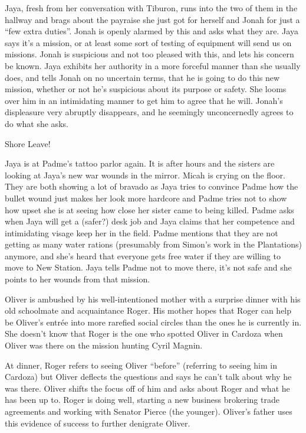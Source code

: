 Jaya, fresh from her conversation with Tiburon, runs into the two of them in the hallway and brags about the payraise she just got for herself and Jonah for just a ``few extra duties''.  Jonah is openly alarmed by this and asks what they are.  Jaya says it's a mission, or at least some sort of testing of equipment will send us on missions.  Jonah is suspicious and not too pleased with this, and lets his concern be known.  Jaya exhibits her authority in a more forceful manner than she usually does, and tells Jonah on no uncertain terms, that he is going to do this new mission, whether or not he's suspicious about its purpose or safety.  She looms over him in an intimidating manner to get him to agree that he will.  Jonah's displeasure very abruptly disappears, and he seemingly unconcernedly agrees to do what she asks.



 {\LARGE Shore Leave! } 



Jaya is at Padme's tattoo parlor again.  It is after hours and the sisters are looking at Jaya's new war wounds in the mirror.  Micah is crying on the floor.  They are both showing a lot of bravado as Jaya tries to convince Padme how the bullet wound just makes her look more hardcore and Padme tries not to show how upset she is at seeing how close her sister came to being killed.  Padme asks when Jaya will get a (safer?) desk job and Jaya claims that her competence and intimidating visage keep her in the field.  Padme mentions that they are not getting as many water rations (presumably from Simon's work in the Plantations) anymore, and she's heard that everyone gets free water if they are willing to move to New Station.  Jaya tells Padme not to move there, it's not safe and she points to her wounds from that mission.



Oliver is ambushed by his well-intentioned mother with a surprise dinner with his old schoolmate and acquaintance Roger.  His mother hopes that Roger can help be Oliver's entrée into more rarefied social circles than the ones he is currently in.  She doesn't know that Roger is the one who spotted Oliver in Cardoza when Oliver was there on the mission hunting Cyril Magnin.  



At dinner, Roger refers to seeing Oliver ``before'' (referring to seeing him in Cardoza) but Oliver deflects the questions and says he can't talk about why he was there. Oliver shifts the focus off of him and asks about Roger and what he has been up to.  Roger is doing well, starting a new business brokering trade agreements and working with Senator Pierce (the younger).  Oliver's father uses this evidence of success to further denigrate Oliver.  



